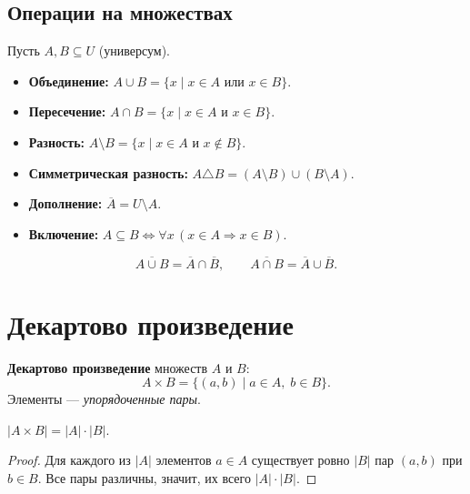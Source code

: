 \documentclass[12pt]{article}
\begin{document}
\subsection{Операции на множествах}

\begin{definition}
Пусть $A, B \subseteq U$ (универсум).
\begin{itemize}
\item \textbf{Объединение:} $A \cup B = \{x \mid x \in A \text{ или } x \in B\}$.
\item \textbf{Пересечение:} $A \cap B = \{x \mid x \in A \text{ и } x \in B\}$.
\item \textbf{Разность:} $A \setminus B = \{x \mid x \in A \text{ и } x \notin B\}$.
\item \textbf{Симметрическая разность:}
      $A \triangle B = (A \setminus B) \cup (B \setminus A)$.
\item \textbf{Дополнение:} $\overline{A} = U \setminus A$.
\item \textbf{Включение:} $A \subseteq B \iff \forall x\,(x \in A \Rightarrow x \in B)$.
\end{itemize}
\end{definition}

\begin{property}
\[
\overline{A \cup B} = \overline{A} \cap \overline{B},
\qquad
\overline{A \cap B} = \overline{A} \cup \overline{B}.
\]
\end{property}

\section{Декартово произведение}

\begin{definition}
\textbf{Декартово произведение} множеств $A$ и $B$:
\[
A \times B = \{(a,b) \mid a \in A,\; b \in B\}.
\]
Элементы --- \emph{упорядоченные пары}.
\end{definition}

\begin{theorem}
$|A \times B| = |A| \cdot |B|$.
\end{theorem}

\begin{proof}
Для каждого из $|A|$ элементов $a \in A$ существует ровно $|B|$
пар $(a,b)$ при $b \in B$. Все пары различны, значит, их всего
$|A| \cdot |B|$.
\end{proof}
\end{document}
